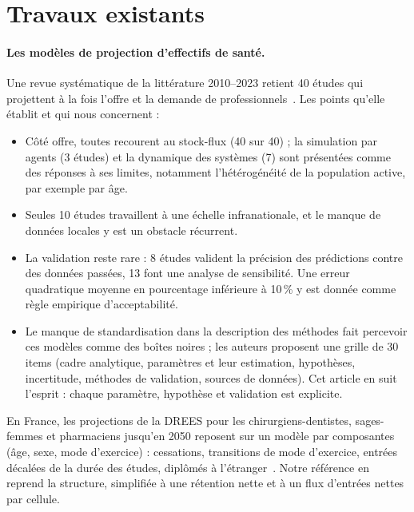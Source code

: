 \section{Travaux existants}
\paragraph{Les modèles de projection d'effectifs de santé.} Une revue systématique de la littérature
2010--2023 retient 40 études qui projettent à la fois l'offre et la demande de
professionnels~\cite{a2-lee2024hrh}. Les points qu'elle établit et qui nous concernent :
\begin{itemize}
  \item Côté offre, toutes recourent au stock-flux (40 sur 40) ; la simulation par agents (3 études) et
        la dynamique des systèmes (7) sont présentées comme des réponses à ses limites, notamment
        l'hétérogénéité de la population active, par exemple par âge.
  \item Seules 10 études travaillent à une échelle infranationale, et le manque de données locales y
        est un obstacle récurrent.
  \item La validation reste rare : 8 études valident la précision des prédictions contre des données
        passées, 13 font une analyse de sensibilité. Une erreur quadratique moyenne en pourcentage
        inférieure à 10\,\% y est donnée comme règle empirique d'acceptabilité.
  \item Le manque de standardisation dans la description des méthodes fait percevoir ces modèles
        comme des boîtes noires ; les auteurs proposent une grille de 30 items (cadre analytique,
        paramètres et leur estimation, hypothèses, incertitude, méthodes de validation, sources de
        données). Cet article en suit l'esprit : chaque paramètre, hypothèse et validation est
        explicite.
\end{itemize}
En France, les projections de la DREES pour les chirurgiens-dentistes, sages-femmes et pharmaciens
jusqu'en 2050 reposent sur un modèle par composantes (âge, sexe, mode d'exercice) : cessations,
transitions de mode d'exercice, entrées décalées de la durée des études, diplômés à
l'étranger~\cite{a2-drees2021dd76}. Notre référence en reprend la structure, simplifiée à une rétention
nette et à un flux d'entrées nettes par cellule.


